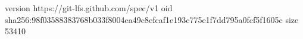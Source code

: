 version https://git-lfs.github.com/spec/v1
oid sha256:98f03588383768b033f8004ea49c8efcaf1e193c775e1f7dd795a0fcf5f1605c
size 53410
